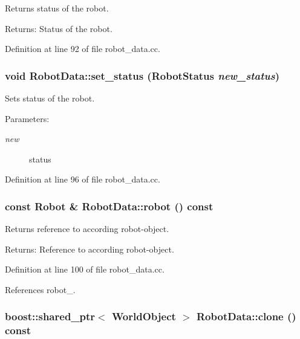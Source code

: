Returns status of the robot. \begin{Desc}
\item[Returns:]Status of the robot. \end{Desc}


Definition at line 92 of file robot\_\-data.cc.\hypertarget{class_robot_data_4a471efa8f681d3978f35f84caa77efd}{
\subsubsection[set\_\-status]{\setlength{\rightskip}{0pt plus 5cm}void RobotData::set\_\-status (RobotStatus {\em new\_\-status})}}
\label{class_robot_data_4a471efa8f681d3978f35f84caa77efd}


Sets status of the robot. \begin{Desc}
\item[Parameters:]
\begin{description}
\item[{\em new}]status \end{description}
\end{Desc}


Definition at line 96 of file robot\_\-data.cc.\hypertarget{class_robot_data_7e08f6f226617e6fda8f4b27e2622959}{
\subsubsection[robot]{\setlength{\rightskip}{0pt plus 5cm}const Robot \& RobotData::robot () const}}
\label{class_robot_data_7e08f6f226617e6fda8f4b27e2622959}


Returns reference to according robot-object. \begin{Desc}
\item[Returns:]Reference to according robot-object. \end{Desc}


Definition at line 100 of file robot\_\-data.cc.

References robot\_\-.\hypertarget{class_robot_data_81b5c3ba1f959f41ff3a9cb8067d75cb}{
\subsubsection[clone]{\setlength{\rightskip}{0pt plus 5cm}boost::shared\_\-ptr$<$ {\bf WorldObject} $>$ RobotData::clone () const}}
\label{class_robot_data_81b5c3ba1f959f41ff3a9cb8067d75cb}


